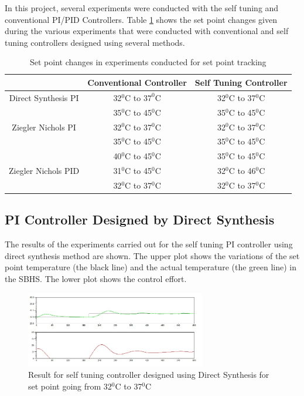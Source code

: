 In this project, several experiments were conducted with the self tuning and conventional PI/PID Controllers. 
Table \ref{spt} shows the set point changes given during the various experiments that were conducted with conventional 
and self tuning controllers designed using several methods.
\begin{table}[h]
	\centering
		\begin{tabular}{||c|c|c|}\hline
			&Conventional Controller&Self Tuning Controller\\\hline \hline
		Direct Synthesis PI&32$^0$C to $37^0$C&32$^0$C to 37$^0$C\\
											 &35$^0$C to 45$^0$C&35$^0$C to 45$^0$C\\\hline
		Ziegler Nichols PI&32$^0$C to 37$^0$C&32$^0$C to 37$^0$C\\
												&35$^0$C to 45$^0$C&35$^0$C to 45$^0$C\\
												&40$^0$C to 45$^0$C&35$^0$C to 45$^0$C\\\hline
		Ziegler Nichols PID&31$^0$C to 45$^0$C&32$^0$C to 46$^0$C\\
												&32$^0$C to 37$^0$C&32$^0$C to 37$^0$C\\\hline
		\end{tabular}
	\caption{Set point changes in experiments conducted for set point tracking}
	\label{spt}
\end{table}
\newpage
\subsection{PI Controller Designed by Direct Synthesis}
The results of the experiments carried out for the self tuning PI controller using direct synthesis method are shown. 
The upper plot shows the variations of the set point temperature (the black line) and the actual temperature (the green line)
in the SBHS. The lower plot shows the control effort.
\begin{figure}[h]
	\centering
\includegraphics[width=0.7\textwidth]{Vikas_self/report_tex/PID_results/self_tuning/NewSetpoint_change/DirectSynthesis/step32to37.jpg}
	\caption{Result for self tuning controller designed using Direct Synthesis for set point going from 32$^0$C to 37$^0$C}
	\label{fig:step32to37}
\end{figure}

